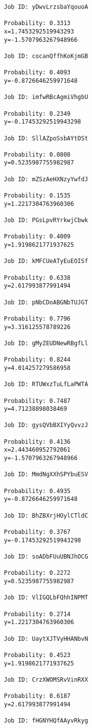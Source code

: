 \documentclass[11pt]{article}
\begin{document}
\begin{Verbatim}[commandchars=\\\{\}]
Job ID: yDwvLrzsbaYqouoA

Probability: 0.3313
x=1.7453292519943293
y=-1.5707963267948966

Job ID: cocanQffhKoKjmGB

Probability: 0.4093
y=-0.8726646259971648

Job ID: imfwRBcAgmiVhgbU

Probability: 0.2349
y=-0.17453292519943298

Job ID: SllAZpoSsbAYtOSt

Probability: 0.0808
y=0.5235987755982987

Job ID: mZSzAeHXNzyYwfdJ

Probability: 0.1535
y=1.2217304763960306

Job ID: PGsLpvRYrkwjCbwk

Probability: 0.4009
y=1.9198621771937625

Job ID: kMFCUeATyEuEOISf

Probability: 0.6338
y=2.617993877991494

Job ID: pNbCDoABGNbTUJGT

Probability: 0.7796
y=3.316125578789226

Job ID: gMyZEUDNewRBgfLl

Probability: 0.8244
y=4.014257279586958

Job ID: RTUWxzTuLfLaPWTA

Probability: 0.7487
y=4.71238898038469

Job ID: gysQVbBXIYyQvvzJ

Probability: 0.4136
x=2.443460952792061
y=-1.5707963267948966

Job ID: MmdNgXXhSPYbuESV

Probability: 0.4935
y=-0.8726646259971648

Job ID: BhZBXrjHOylCTldC

Probability: 0.3767
y=-0.17453292519943298

Job ID: soADbFUuUBNJhOCG

Probability: 0.2272
y=0.5235987755982987

Job ID: VlIGQLbFQhhINPMT

Probability: 0.2714
y=1.2217304763960306

Job ID: UaytXJTVyHHANbvN

Probability: 0.4523
y=1.9198621771937625

Job ID: CrzXWOMSRvVinRXX

Probability: 0.6187
y=2.617993877991494

Job ID: fHGNYHQfAAyvRkyg


\end{Verbatim}
\end{document}
